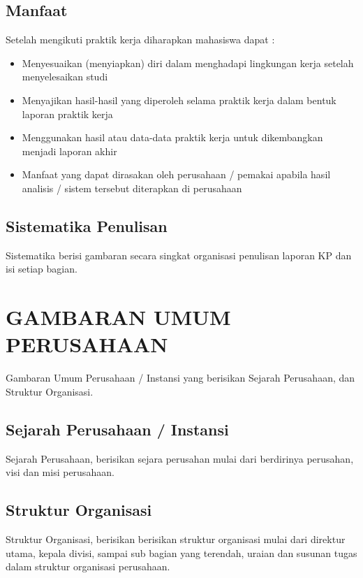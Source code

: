 \documentclass[oneside,listof=totoc]{scrbook}
\begin{document}
\section{Manfaat}
Setelah mengikuti praktik kerja diharapkan mahasiswa dapat :
\begin{itemize}
  \item Menyesuaikan (menyiapkan) diri dalam menghadapi lingkungan kerja setelah menyelesaikan studi
  \item Menyajikan hasil-hasil yang diperoleh selama praktik kerja dalam bentuk laporan praktik kerja
  \item Menggunakan hasil atau data-data praktik kerja untuk dikembangkan menjadi laporan akhir
  \item Manfaat yang dapat dirasakan oleh perusahaan / pemakai apabila hasil analisis / sistem tersebut diterapkan di perusahaan
\end{itemize}

\section{Sistematika Penulisan}
Sistematika berisi gambaran secara singkat organisasi penulisan laporan KP dan isi setiap bagian.

\chapter{GAMBARAN UMUM PERUSAHAAN}

\vspace{0.5cm}

Gambaran Umum Perusahaan / Instansi yang berisikan Sejarah Perusahaan, dan Struktur Organisasi.

\section{Sejarah Perusahaan / Instansi}
Sejarah Perusahaan, berisikan sejara perusahan mulai dari berdirinya perusahan, visi dan misi perusahaan.

\section{Struktur Organisasi}
Struktur Organisasi, berisikan berisikan struktur organisasi mulai dari direktur utama, kepala divisi, sampai sub bagian yang terendah, uraian dan susunan tugas dalam struktur organisasi perusahaan.

\vspace{0.5cm}
\end{document}
